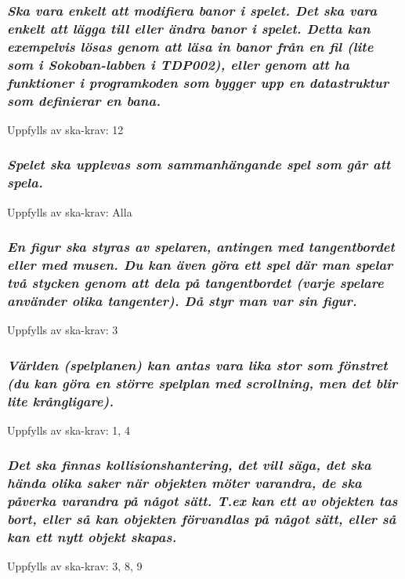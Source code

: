 \documentclass{TDP005mall}
\begin{document}
\subsubsection{\emph{ Ska vara enkelt att modifiera banor i spelet. Det ska vara enkelt att lägga till eller ändra banor i spelet. Detta kan exempelvis lösas genom att läsa in banor från en fil (lite som i Sokoban-labben i TDP002), eller genom att ha funktioner i programkoden som bygger upp en datastruktur som definierar en bana. }}
Uppfylls av ska-krav: 12

\subsubsection{\emph{ Spelet ska upplevas som sammanhängande spel som går att spela.}}
Uppfylls av ska-krav: Alla

\subsubsection{\emph{ En figur ska styras av spelaren, antingen med tangentbordet eller med musen. Du kan även göra ett spel där man spelar två stycken genom att dela på tangentbordet (varje spelare använder olika tangenter). Då styr man var sin figur.}}
Uppfylls av ska-krav: 3

\subsubsection{\emph{ Världen (spelplanen) kan antas vara lika stor som fönstret (du kan göra en större spelplan med scrollning, men det blir lite krångligare).}}
Uppfylls av ska-krav: 1, 4

\subsubsection{\emph{ Det ska finnas kollisionshantering, det vill säga, det ska hända olika saker när objekten möter varandra, de ska påverka varandra på något sätt. T.ex kan ett av objekten tas bort, eller så kan objekten förvandlas på något sätt, eller så kan ett nytt objekt skapas.}}
Uppfylls av ska-krav: 3, 8, 9
\end{document}
